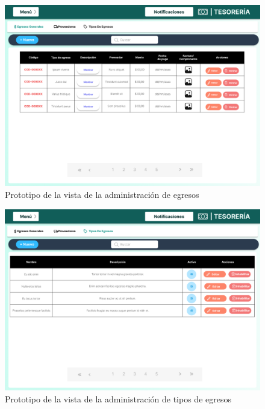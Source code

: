\begin{figure}[H]
    \centering
    \includegraphics[width=1\textwidth]{resources/images/tesoreia - egresos - generales}
    \caption{Prototipo de la vista de la administración de egresos}
    \label{fig:tesoreria-egresos}
\end{figure}

\begin{figure}[H]
    \centering
    \includegraphics[width=1\textwidth]{resources/images/tesoreia - egresos - tipos}
    \caption{Prototipo de la vista de la administración de tipos de egresos}
    \label{fig:tesoreria-egresos-tipos}
\end{figure}

